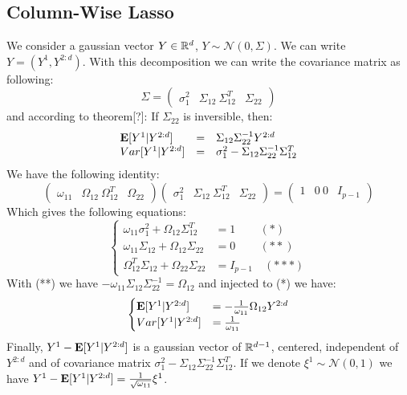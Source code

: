 \subsection{Column-Wise Lasso}

We consider a gaussian vector $Y\in {\mathbb R}^d$, $Y \sim \mathcal N(0,\Sigma)$. We can write $Y=(Y^1,Y^{2:d})$. With this decomposition we can write the covariance matrix as following:
\begin{equation}
\Sigma=
 \begin{pmatrix}
\sigma_1^2 & \Sigma_{12}\
\Sigma_{12}^T & \Sigma_{22}
\end{pmatrix}
\end{equation}
and according to theorem[?]: If $\Sigma_{22}$ is inversible, then:
\begin{equation}
\begin{array}{lcl}
\mathbf E[Y^1|Y^{2:d}]&=&\Sigma_{12}\Sigma_{22}^{-1}Y^{2:d}\\
Var[Y^1|Y^{2:d}]&=&\sigma_1^2-\Sigma_{12}\Sigma_{22}^{-1}\Sigma_{12}^T
\end{array}
\end{equation}
We have the following identity:
\begin{equation}
 \begin{pmatrix}
 \omega_{11}&\Omega_{12}\
 \Omega_{12}^T&\Omega_{22}
\end{pmatrix}
 \begin{pmatrix}
 \sigma_{1}^2&\Sigma_{12}\
 \Sigma_{12}^T&\Sigma_{22}
\end{pmatrix}
=
 \begin{pmatrix}
 1&0\
0&I_{p-1}
\end{pmatrix}
\end{equation}
Which gives the following equations:
\begin{equation}
  \begin{cases}
  \omega_{11}\sigma_1^2+\Omega_{12}\Sigma_{12}^T&=1\quad\,\quad(*) \\
  \omega_{11}\Sigma_{12}+\Omega_{12}\Sigma_{22}&=0\quad\,\quad(**)\\
  \Omega_{12}^T\Sigma_{12}+\Omega_{22}\Sigma_{22}&=I_{p-1}\quad(***)
  \end{cases}
\end{equation}
With (**) we have $-\omega_{11}\Sigma_{12}\Sigma_{22}^{-1}=\Omega_{12}$ and injected to (*) we have:
\begin{equation}
 \begin{cases}
 \mathbf E[Y^1|Y^{2:d}]&=-\frac{1}{\omega_{11}}\Omega_{12}Y^{2:d}\\
  Var[Y^1|Y^{2:d}]&=\frac{1}{\omega_{11}}
  \end{cases}
\end{equation}
Finally, $Y^1-\mathbf E[Y^1|Y^{2:d}]$ is a gaussian vector of ${\mathbb R}^{d-1}$, centered, independent of $Y^{2:d}$ and of covariance matrix $\sigma_1^2-\Sigma_{12}\Sigma_{22}^{-1}\Sigma_{12}^T$. If we denote  $\xi^1\sim \mathcal N(0,1)$ we have $Y^1-\mathbf E[Y^1|Y^{2:d}]=\frac{1}{ \sqrt{\omega_{11}}}\xi^1$.\

